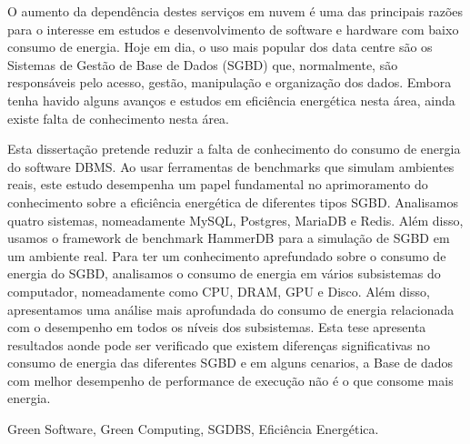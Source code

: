 O aumento da dependência destes serviços em nuvem é uma das principais razões para o interesse em estudos e desenvolvimento de software e hardware com baixo consumo de energia. Hoje em dia, o uso mais popular dos data centre são os Sistemas de Gestão de Base de Dados (SGBD) que, normalmente, são responsáveis pelo acesso, gestão, manipulação e organização dos dados. Embora tenha havido alguns avanços e estudos em eficiência energética nesta área, ainda existe falta de conhecimento nesta área.

Esta dissertação pretende reduzir a falta de conhecimento do consumo de energia do software DBMS. Ao usar ferramentas de benchmarks que simulam ambientes reais, este estudo desempenha um papel fundamental no aprimoramento do conhecimento sobre a eficiência energética de diferentes tipos SGBD. Analisamos quatro sistemas, nomeadamente MySQL, Postgres, MariaDB e Redis. Além disso, usamos o framework de benchmark HammerDB para a simulação de SGBD em um ambiente real. Para ter um conhecimento aprefundado sobre o consumo de energia do SGBD, analisamos o consumo de energia em vários subsistemas do computador, nomeadamente como CPU, DRAM, GPU e Disco. Além disso, apresentamos uma análise mais aprofundada do consumo de energia relacionada com o desempenho em todos os níveis dos subsistemas. 
Esta tese apresenta resultados aonde pode ser verificado que existem diferenças significativas no consumo de energia das diferentes SGBD e em alguns cenarios, a Base de dados com melhor desempenho de performance de execução não é o que consome mais energia.






\begin{keywords}
Green Software, Green Computing, SGDBS, Eficiência Energética.
\end{keywords}
